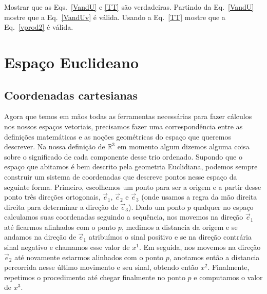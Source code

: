 \begin{Exercise}[title={Produtos triplos}]
	\Question[difficulty=1] Mostrar que as Eqs.~\eqref{VandU} e \eqref{TT} são verdadeiras.
	\Question Partindo da Eq.~\eqref{VandU} mostre que a Eq.~\eqref{VandUv} é válida.
	\Question Usando a Eq.~\eqref{TT} mostre que a Eq.~\eqref{vprod2} é válida.
\end{Exercise}

\section{Espaço Euclideano}
\label{sec:euclid}
\subsection{Coordenadas cartesianas}

Agora que temos em mãos todas as ferramentas necessárias para fazer cálculos nos
nossos espaços vetoriais, precisamos fazer uma correspondência entre as
definições matemáticas e as noções geométricas do espaço que queremos descrever.
Na nossa definição de $\mathbb{R}^3$ em momento algum dizemos alguma coisa sobre
o significado de cada componente desse trio ordenado. Supondo que o espaço que
abitamos é bem descrito pela geometria Euclidiana, podemos sempre construir um
sistema de coordenadas que descreve pontos nesse espaço da seguinte forma.
Primeiro, escolhemos um ponto para ser a origem e a partir desse ponto três
direções ortogonais, $\vec{e}_1$, $\vec{e}_2$ e $\vec{e}_3$ (onde usamos a regra
da mão direita direita para determinar a direção de $\vec{e}_3$). Dado um ponto
$p$ qualquer no espaço calculamos suas coordenadas seguindo a sequência, nos
movemos na direção $\vec{e}_1$ até ficarmos alinhados com o ponto $p$, medimos a
distancia da origem e se andamos na direção de $\vec{e}_1$ atribuímos o sinal
positivo e se na direção contrária sinal negativo e chamamos esse valor de
$x^1$. Em seguida, nos movemos na direção $\vec{e}_2$ até novamente estarmos
alinhados com o ponto $p$, anotamos então a distancia percorrida nesse último
movimento e seu sinal, obtendo então $x^2$. Finalmente, repetimos o procedimento
até chegar finalmente no ponto $p$ e computamos o valor de $x^3$.


